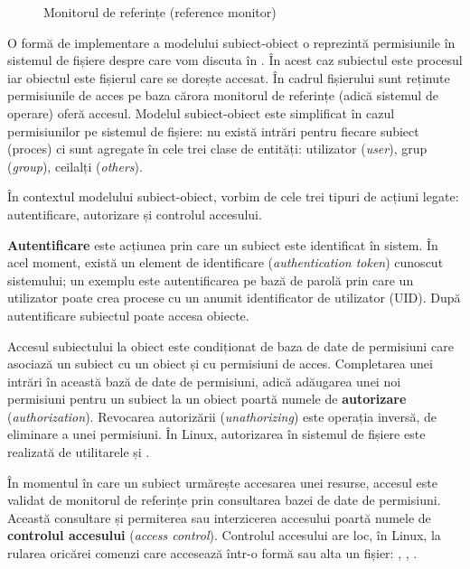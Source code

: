 \begin{figure}[htbp]
  \centering
  \def\svgwidth{\columnwidth}
  
  \caption{Monitorul de referințe (reference monitor)}
  \label{fig:sec:reference-monitor}
\end{figure}

O formă de implementare a modelului subiect-obiect o reprezintă permisiunile în sistemul de fișiere despre care vom discuta în . În acest caz subiectul este procesul iar obiectul este fișierul care se dorește accesat. În cadrul fișierului sunt reținute permisiunile de acces pe baza cărora monitorul de referințe (adică sistemul de operare) oferă accesul. Modelul subiect-obiect este simplificat în cazul permisiunilor pe sistemul de fișiere: nu există intrări pentru fiecare subiect (proces) ci sunt agregate în cele trei clase de entități: utilizator (\textit{user}), grup (\textit{group}), ceilalți (\textit{others}).

În contextul modelului subiect-obiect, vorbim de cele trei tipuri de acțiuni legate: autentificare, autorizare și controlul accesului.

\textbf{Autentificare} este acțiunea prin care un subiect este identificat în sistem. În acel moment, există un element de identificare (\textit{authentication token}) cunoscut sistemului; un exemplu este autentificarea pe bază de parolă prin care un utilizator poate crea procese cu un anumit identificator de utilizator (UID). După autentificare subiectul poate accesa obiecte.

Accesul subiectului la obiect este condiționat de baza de date de permisiuni care asociază un subiect cu un obiect și cu permisiuni de acces. Completarea unei intrări în această bază de date de permisiuni, adică adăugarea unei noi permisiuni pentru un subiect la un obiect poartă numele de \textbf{autorizare} (\textit{authorization}). Revocarea autorizării (\textit{unathorizing}) este operația inversă, de eliminare a unei permisiuni. În Linux, autorizarea în sistemul de fișiere este realizată de utilitarele  și .

În momentul în care un subiect urmărește accesarea unei resurse, accesul este validat de monitorul de referințe prin consultarea bazei de date de permisiuni. Această consultare și permiterea sau interzicerea accesului poartă numele de \textbf{controlul accesului} (\textit{access control}). Controlul accesului are loc, în Linux, la rularea oricărei comenzi care accesează într-o formă sau alta un fișier: , , .

